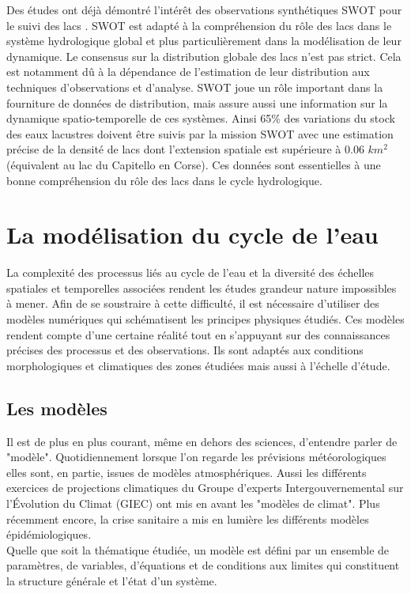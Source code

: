 \noindent Des études ont déjà démontré l'intérêt des observations synthétiques SWOT pour le suivi des lacs \citep{lee2010, cretaux2016, gao2016}. SWOT est adapté à la compréhension du rôle des lacs dans le système hydrologique global et plus particulièrement dans la modélisation de leur dynamique. Le consensus sur la distribution globale des lacs n'est pas strict. Cela est notamment dû à la dépendance de l'estimation de leur distribution aux techniques d'observations et d'analyse. SWOT joue un rôle important dans la fourniture de données de distribution, mais assure aussi une information sur la dynamique spatio-temporelle de ces systèmes. Ainsi 65\% des variations du stock des eaux lacustres doivent être suivis par la mission SWOT \citep{biancamaria2009} avec une estimation précise de la densité de lacs dont l'extension spatiale est supérieure à 0.06 $km^{2}$ (équivalent au lac du Capitello en Corse). Ces données sont essentielles à une bonne compréhension du rôle des lacs dans le cycle hydrologique.


\section{{\selectfont La modélisation du cycle de l'eau}}

La complexité des processus liés au cycle de l'eau et la diversité des échelles spatiales et temporelles associées rendent les études grandeur nature impossibles à mener. Afin de se soustraire à cette difficulté, il est nécessaire d'utiliser des modèles numériques qui schématisent les principes physiques étudiés. Ces modèles rendent compte d'une certaine réalité tout en s'appuyant sur des connaissances précises des processus et des observations. Ils sont adaptés aux conditions morphologiques et climatiques des zones étudiées mais aussi à l'échelle d'étude.  

\subsection{{\selectfont Les modèles}}

Il est de plus en plus courant, même en dehors des sciences, d'entendre parler de "modèle". Quotidiennement lorsque l'on regarde les prévisions météorologiques elles sont, en partie, issues de modèles atmosphériques. Aussi les différents exercices de projections climatiques du Groupe d'experts Intergouvernemental sur l'\'Evolution du Climat (GIEC) ont mis en avant les "modèles de climat". Plus récemment encore, la crise sanitaire a mis en lumière les différents modèles épidémiologiques. \\
Quelle que soit la thématique étudiée, un modèle est défini par un ensemble de paramètres, de variables, d'équations et de conditions aux limites qui constituent la structure générale et l'état d'un système.\\

